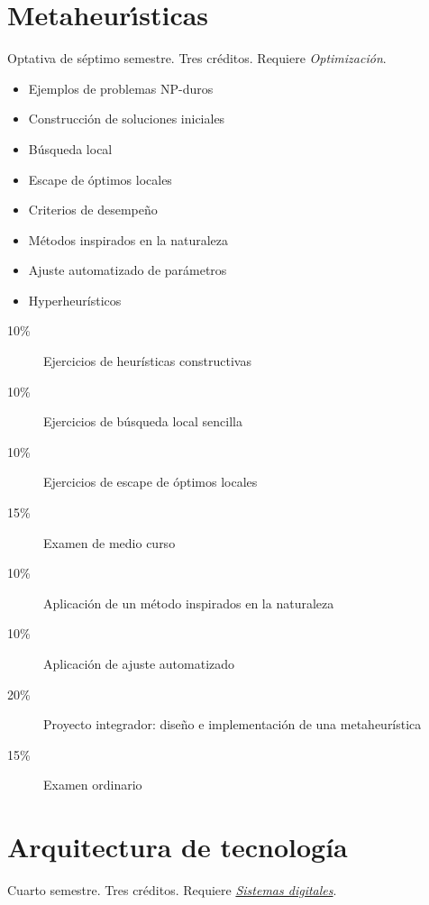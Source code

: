 \documentclass{article}
\begin{document}
\begin{multicols}{4}
\vfill\null \columnbreak

\hypertarget{mh}{\section*{Metaheur\'{\i}sticas}} 

Optativa de s\'{e}ptimo semestre. Tres cr\'{e}ditos. Requiere {\em
  Optimizaci\'{o}n}.

\begin{itemize}
\item{Ejemplos de problemas NP-duros}  
\item{Construcci\'{o}n de soluciones iniciales}
\item{B\'{u}squeda local}
\item{Escape de \'{o}ptimos locales}
\item{Criterios de desempe\~{n}o}  
\item{M\'{e}todos inspirados en la naturaleza}
\item{Ajuste automatizado de par\'{a}metros}
\item{Hyperheur\'{i}sticos}
\end{itemize}

\begin{description}
\item[10\%]{Ejercicios de heur\'{i}sticas constructivas}
\item[10\%]{Ejercicios de b\'{u}squeda local sencilla}
\item[10\%]{Ejercicios de escape de \'{o}ptimos locales}  
\item[15\%]{Examen de medio curso}
\item[10\%]{Aplicaci\'{o}n de un m\'{e}todo inspirados en la naturaleza}
\item[10\%]{Aplicaci\'{o}n de ajuste automatizado}
\item[20\%]{Proyecto integrador: dise\~{n}o e implementaci\'{o}n de
  una metaheur\'{i}stica}
\item[15\%]{Examen ordinario}
\end{description}  

\newpage

\hypertarget{at}{\section*{Arquitectura de tecnolog\'{i}a}}

Cuarto semestre. Tres cr\'{e}ditos. Requiere \hyperlink{sd}{\em
  Sistemas digitales}.


\end{multicols}
\end{document}
